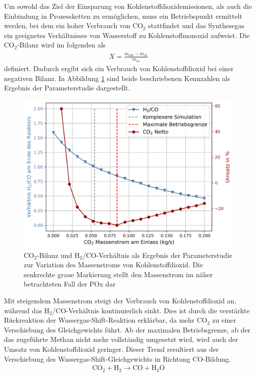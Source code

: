         Um sowohl das Ziel der Einsparung von Kohlenstoffdioxidemissionen, als auch die Einbindung in Prozessketten zu ermöglichen, muss ein Betriebspunkt ermittelt werden, bei dem ein hoher Verbrauch von CO$_2$ stattfindet und das Synthesegas ein geeignetes Verhältnisses von Wasserstoff zu Kohlenstoffmonoxid aufweist. Die CO$_2$-Bilanz wird im folgenden als 
        \begin{align}
            X = \frac{\dot m_{out} - \dot m_{in} }{\dot m_{in}} 
        \end{align}
        definiert. Dadurch ergibt sich ein Verbrauch von Kohlenstoffdioxid bei einer negativen Bilanz. In Abbildung \ref{fig:auswertung_co2_bilanz} sind beide beschriebenen Kennzahlen als Ergebnis der Parameterstudie dargestellt. 
        \begin{figure}[H]
            \centering
            \includegraphics[width=0.75\linewidth]{img/Parameterstudie_CO2/Parameterstudie_CO2_Bilanz.png}
            \caption{CO$_2$-Bilanz und H$_2$/CO-Verhältnis als Ergebnis der Parameterstudie zur Variation des Massenstroms von Kohlenstoffdioxid. Die senkrechte graue Markierung stellt den Massenstrom im näher betrachteten Fall der POx dar}
            \label{fig:auswertung_co2_bilanz}
        \end{figure}
        Mit steigendem Massenstrom steigt der Verbrauch von Kohlenstoffdioxid an, während das H$_2$/CO-Verhältnis kontinuierlich sinkt. Dies ist durch die verstärkte Rückreaktion der Wassergas-Shift-Reaktion erklärbar, da mehr CO$_2$ zu einer Verschiebung des Gleichgewichts führt. Ab der maximalen Betriebsgrenze, ab der das zugeführte Methan nicht mehr vollständig umgesetzt wird, wird auch der Umsatz von Kohlenstoffdioxid geringer. 
        Dieser Trend resultiert aus der Verschiebung des Wassergas-Shift-Gleich\-gewichts in Richtung CO-Bildung.
        \begin{align}
            \mathrm{CO_2 + H_2 \longrightarrow CO + H_2O}
        \end{align}
